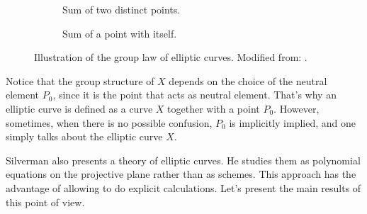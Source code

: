 \documentclass{report}
\theoremstyle{definition}
\begin{document}
\begin{figure}[!ht]
\begin{center}
\begin{subfigure}{0.45\textwidth}
\centering
{}
\caption{Sum of two distinct points.}
\end{subfigure}
\begin{subfigure}{0.45\textwidth}
\centering
{}
\caption{Sum of a point with itself.}
\end{subfigure}
\caption{Illustration of the group law of elliptic curves. Modified from: \cite[Figure~3.3]{silverman1986arithmetic}.}
\label{fig:group-law}
\end{center}
\end{figure}

Notice that the group structure of $X$ depends on the choice of the neutral element $P_0$, since it is the point that acts as neutral element. That's why an elliptic curve is defined as a curve $X$ together with a point $P_0$. However, sometimes, when there is no possible confusion, $P_0$ is implicitly implied, and one simply talks about the elliptic curve $X$.
\vspace{2mm}

Silverman \cite[Chapter~III]{silverman1986arithmetic} also presents a theory of elliptic curves. He studies them as polynomial equations on the projective plane rather than as schemes. This approach has the advantage of allowing to do explicit calculations. Let's present the main results of this point of view.
\end{document}
